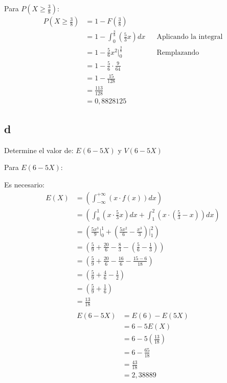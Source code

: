 \documentclass{templateNote}
\begin{document}
Para $\displaystyle P\left(X \geq \frac{3}{8}\right)$:
\begin{align*}
    \displaystyle P\left(X \geq \frac{3}{8}\right) &= 1 - F(\frac{3}{8})\\
    &= 1 - \int_{0}^{\frac{3}{8}}{(\frac{5}{3}x)dx} && \text{Aplicando la integral} \\
    &= 1 - \frac{5}{6}x^2 \Big|_{0}^{\frac{3}{8}} && \text{Remplazando} \\
    &= 1 - \frac{5}{6} \cdot \frac{9}{64} \\
    &= 1 - \frac{15}{128} \\
    &= \frac{113}{128} \\
    &= 0,8828125
\end{align*}

\subsection{d}
Determine el valor de: $E(6-5X)$ y $V(6-5X)$

Para $E(6-5X)$:

Es necesario:
\begin{align*}
    E(X) &= \left(\int_{-\infty}^{+\infty}{(x\cdot f(x))dx}\right) \\
    &= \left(\int_{0}^{1}{(x\cdot \frac{5}{3}x)dx} + \int_{1}^{2}{(x\cdot (\frac{5}{3} - x))dx}\right) \\
    &= \left(\frac{5x^3}{9}\Big|_{0}^{1} + \left(\frac{5x^2}{6} - \frac{x^3}{3}\right)\Big|_{1}^{2}\right) \\
    &= \left(\frac{5}{9} + \frac{20}{6} - \frac{8}{3} - \left(\frac{5}{6} - \frac{1}{3}\right)\right) \\
    &= \left(\frac{5}{9} + \frac{20}{6} - \frac{16}{6} - \frac{15-6}{18}\right) \\
    &= \left(\frac{5}{9} + \frac{4}{6} - \frac{1}{2}\right) \\
    &= \left(\frac{5}{9} + \frac{1}{6}\right) \\
    &= \frac{13}{18} \\
\end{align*}
\begin{align*}
    E(6-5X) &= E(6) - E(5X) \\
    &= 6 - 5E(X) \\
    &= 6 - 5 \left(\frac{13}{18}\right) \\
    &= 6 - \frac{65}{18}\\
    &= \frac{43}{18} \\
    &= 2,38889
\end{align*}
\end{document}
